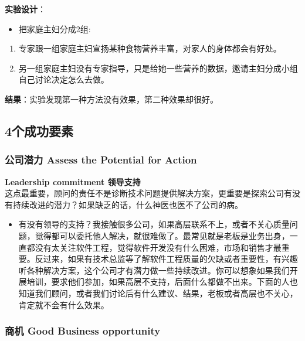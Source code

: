 \textbf{实验设计}：

\begin{itemize}
\tightlist
\item
  把家庭主妇分成2组:
\end{itemize}

\begin{enumerate}
\tightlist
\item
  专家跟一组家庭主妇宣扬某种食物营养丰富，对家人的身体都会有好处。
\item
  另一组家庭主妇没有专家指导，只是给她一些营养的数据，邀请主妇分成小组自己讨论决定怎么去做。\\
\end{enumerate}

\textbf{结果}：实验发现第一种方法没有效果，第二种效果却很好。

\hypertarget{ux4e2aux6210ux529fux8981ux7d20}{%
\subsection{4个成功要素}\label{ux4e2aux6210ux529fux8981ux7d20}}


\hypertarget{ux516cux53f8ux6f5cux529b-assess-the-potential-for-action}{%
\subsubsection{公司潜力 Assess the Potential for
Action}\label{ux516cux53f8ux6f5cux529b-assess-the-potential-for-action}}

\textbf{Leadership commitment 领导支持}\\
这点最重要，顾问的责任不是诊断技术问题提供解决方案，更重要是探索公司有没有持续改进的潜力？如果缺乏的话，什么神医也医不了公司的病。

\begin{itemize}
\tightlist
\item
  有没有领导的支持？我接触很多公司，如果高层联系不上，或者不关心质量问题，觉得都可以委托他人解决，就很难做了。最常见就是老板是业务出身，一直都没有太关注软件工程，觉得软件开发没有什么困难，市场和销售才最重要。反过来，如果有技术总监等了解软件工程质量的欠缺或者重要性，有兴趣听各种解决方案，这个公司才有潜力做一些持续改进。你可以想象如果我们开展培训，要求他们参加，如果高层不支持，后面什么都做不出来。下面的人也知道我们顾问，或者我们讨论后有什么建议、结果，老板或者高层也不关心，肯定就不会有什么效果。
\end{itemize}

\hypertarget{ux5546ux673a-good-business-opportunity}{%
\subsubsection{商机 Good Business
opportunity}\label{ux5546ux673a-good-business-opportunity}}

